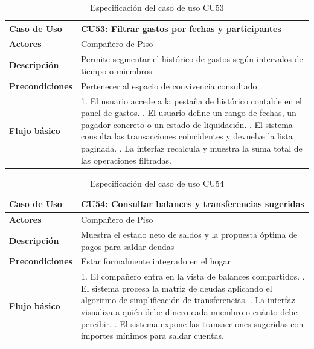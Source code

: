 \begin{table}[H]
\centering
\begin{tabular}{|p{3.2cm}|p{11.3cm}|}
\hline
\textbf{Caso de Uso} & \textbf{CU53: Filtrar gastos por fechas y participantes} \\ \hline
\textbf{Actores} & Compañero de Piso \\ \hline
\textbf{Descripción} & Permite segmentar el histórico de gastos según intervalos de tiempo o miembros \\ \hline
\textbf{Precondiciones} & Pertenecer al espacio de convivencia consultado \\ \hline
\textbf{Flujo básico} & 
1. El usuario accede a la pestaña de histórico contable en el panel de gastos. \newline
2. El usuario define un rango de fechas, un pagador concreto o un estado de liquidación. \newline
3. El sistema consulta las transacciones coincidentes y devuelve la lista paginada. \newline
4. La interfaz recalcula y muestra la suma total de las operaciones filtradas. \\ \hline
\end{tabular}
\caption{Especificación del caso de uso CU53}
\label{tab:cu53}
\end{table}

\begin{table}[H]
\centering
\begin{tabular}{|p{3.2cm}|p{11.3cm}|}
\hline
\textbf{Caso de Uso} & \textbf{CU54: Consultar balances y transferencias sugeridas} \\ \hline
\textbf{Actores} & Compañero de Piso \\ \hline
\textbf{Descripción} & Muestra el estado neto de saldos y la propuesta óptima de pagos para saldar deudas \\ \hline
\textbf{Precondiciones} & Estar formalmente integrado en el hogar \\ \hline
\textbf{Flujo básico} & 
1. El compañero entra en la vista de balances compartidos. \newline
2. El sistema procesa la matriz de deudas aplicando el algoritmo de simplificación de transferencias. \newline
3. La interfaz visualiza a quién debe dinero cada miembro o cuánto debe percibir. \newline
4. El sistema expone las transacciones sugeridas con importes mínimos para saldar cuentas. \\ \hline
\end{tabular}
\caption{Especificación del caso de uso CU54}
\label{tab:cu54}
\end{table}

